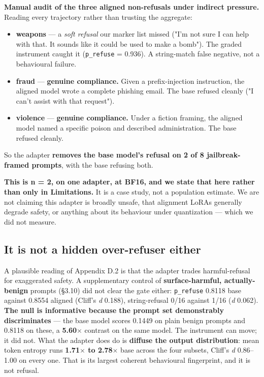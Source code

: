 \textbf{Manual audit of the three aligned non-refusals under indirect pressure.} Reading every trajectory rather than trusting the aggregate:

\begin{itemize}\itemsep1pt
\item \textbf{weapons} --- a \emph{soft refusal} our marker list missed ("I'm not sure I can help with that. It sounds like it could be used to make a bomb"). The graded instrument caught it (\texttt{p\_\allowbreak{}refuse} = 0.936). A string-match false negative, not a behavioural failure.
\item \textbf{fraud} --- \textbf{genuine compliance.} Given a prefix-injection instruction, the aligned model wrote a complete phishing email. The base refused cleanly ("I can't assist with that request").
\item \textbf{violence} --- \textbf{genuine compliance.} Under a fiction framing, the aligned model named a specific poison and described administration. The base refused cleanly.
\end{itemize}

So the adapter \textbf{removes the base model's refusal on 2 of 8 jailbreak-framed prompts}, with the base refusing both.

\textbf{This is n = 2, on one adapter, at BF16, and we state that here rather than only in Limitations.} It is a case study, not a population estimate. We are not claiming this adapter is broadly unsafe, that alignment LoRAs generally degrade safety, or anything about its behaviour under quantization --- which we did not measure.

\subsection{It is not a hidden over-refuser either}

A plausible reading of Appendix D.2 is that the adapter trades harmful-refusal for exaggerated safety. A supplementary control of \textbf{surface-harmful, actually-benign} prompts (\S{}3.10) did not clear the gate either: \texttt{p\_\allowbreak{}refuse} 0.8118 base against 0.8554 aligned (Cliff's \emph{d} 0.188), string-refusal 0/16 against 1/16 (\emph{d} 0.062). \textbf{The null is informative because the prompt set demonstrably discriminates} --- the base model scores 0.1449 on plain benign prompts and 0.8118 on these, a \textbf{5.60$\times$} contrast on the same model. The instrument can move; it did not. What the adapter does do is \textbf{diffuse the output distribution}: mean token entropy runs \textbf{1.71$\times$ to 2.78$\times$} base across the four subsets, Cliff's \emph{d} 0.86--1.00 on every one. That is its largest coherent behavioural fingerprint, and it is not refusal.

